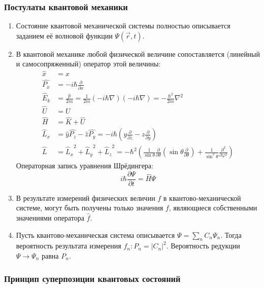 \subsubsection{Постулаты квантовой механики}
\begin{enumerate}[label=\textbf{Постулат №\arabic{enumi}},leftmargin=2.5cm]
	\item Состояние квантовой механической системы полностью описывается заданием её волновой функции $\Psi(\vec r, t)$.
	
	\item В квантовой механике любой физической величине сопоставляется (линейный и самосопряженный) оператор этой величины:
	\begin{align*}
		\widehat x &= x\\
		\widehat{P_x} &= -i\hbar \frac{\partial}{\partial x}\\
		\widehat E_k &= \frac{\widehat p}{2m} = \frac{1}{2m} (-i\hbar\nabla)(-i\hbar\nabla)=-\frac{\hbar^2}{2m}\nabla^2\\
		\widehat U &= U\\
		\widehat H &= \widehat K + \widehat U\\
		\widehat L_x &= \widehat{y}\widehat{P_z}-\widehat{z}\widehat{P_y}=-i\hbar\left(y\frac{\partial}{\partial z}-z\frac{\partial}{\partial y}\right)\\
		\widehat L &= {\widehat L_x}^2+{\widehat L_y}^2+{\widehat L_z}^2=-\hbar^2\left(\frac{1}{\sin \theta}\frac{\partial}{\partial\theta}\left(\sin \theta \frac{\partial}{\partial\theta}\right) + \frac{1}{\sin^2\theta}\frac{\partial^2}{\partial\varphi^2}\right)
	\end{align*}
	Операторная запись уравнения Шрёдингера:
	\begin{equation*}
		i\hbar \frac{\partial \Psi}{\partial t} = \widehat{H} \Psi
	\end{equation*}
	
	\item В результате измерений физических величин $f$ в квантово-механической системе, могут быть получены только значения $f$, являющиеся собственными значениями оператора $\widehat f$.
	
	\item Пусть квантово-механическая система описывается $\Psi=\sum_n C_n\Psi_n$. Тогда вероятность результата измерения $f_n: P_n = \left|C_n\right|^2$. Вероятность редукции $\Psi \to \Psi_n$ равна $P_n$.
\end{enumerate}

\subsubsection{Принцип суперпозиции квантовых состояний}

